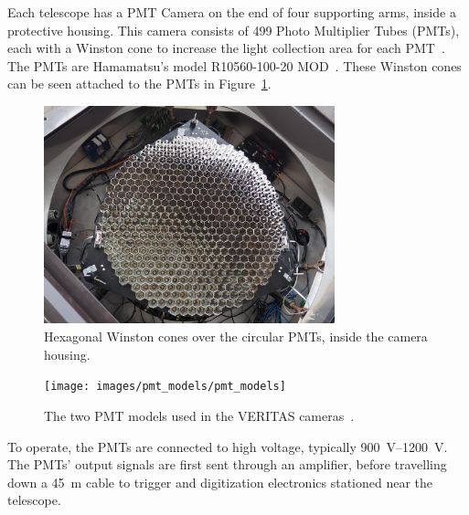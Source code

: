 Each telescope has a PMT Camera on the end of four supporting arms, inside a protective housing.
This camera consists of 499 Photo Multiplier Tubes (PMTs), each with a Winston cone to increase the light collection area for each PMT~\cite{Winston1970}.
The PMTs are Hamamatsu's model R10560-100-20 MOD~\cite{pmtmodels}.
These Winston cones can be seen attached to the PMTs in Figure~\ref{fig:winstcones}.

\begin{figure}[ht]
  \centering
  \includegraphics[width=0.75\textwidth]{images/winston_cones_t2}
  \caption[Winston Cones]{
    Hexagonal Winston cones over the circular PMTs, inside the camera housing.}
  \label{fig:winstcones}
\end{figure}


\begin{figure}[ht]
  \centering
  \texttt{[image: images/pmt\_models/pmt\_models]}
  \caption[PMT Models]{
    The two PMT models used in the VERITAS cameras~\cite{pmtmodels}.}
  \label{fig:pmtmodels}
\end{figure}

To operate, the PMTs are connected to high voltage, typically \SIrange{900}{1200}{V}.
%
%
The PMTs' output signals are first sent through an amplifier, before travelling down a \nicetilde{}\SI{45}{m} cable to trigger and digitization electronics stationed near the telescope.

